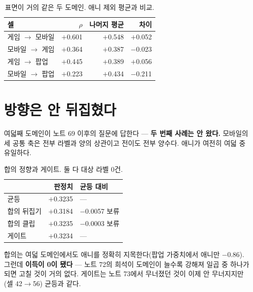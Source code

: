 \documentclass[10pt]{article}
\begin{document}
\begin{table}[t]
\centering\tsize
\caption{표면이 거의 같은 두 도메인. 애니 제외 평균과 비교.}
\begin{tabular}{lrrr}
\toprule
셀 & $\rho$ & 나머지 평균 & 차이 \\
\midrule
게임 $\to$ 모바일 & $+$0.601 & $+$0.548 & $+$0.052 \\
모바일 $\to$ 게임 & $+$0.364 & $+$0.387 & $-$0.023 \\
\midrule
게임 $\to$ 팝업 & $+$0.445 & $+$0.389 & $+$0.056 \\
모바일 $\to$ 팝업 & $+$0.223 & $+$0.434 & $-$0.211 \\
\bottomrule
\end{tabular}
\end{table}


\section{방향은 안 뒤집혔다}

여덟째 도메인이 노트 69 이후의 질문에 답한다 --- \textbf{두 번째 사례는 안
왔다.} 모바일의 세 공통 축은 전부 라벨과 양의 상관이고 전이도 전부 양수다.
애니가 여전히 여덟 중 유일하다.

\begin{table}[t]
\centering\tsize
\caption{합의 정향과 게이트. 둘 다 대상 라벨 0건.}
\begin{tabular}{lrl}
\toprule
& 판정치 & 균등 대비 \\
\midrule
균등 & $+$0.3235 & --- \\
합의 뒤집기 & $+$0.3184 & $-$0.0057 보류 \\
합의 클립 & $+$0.3235 & $-$0.0003 보류 \\
게이트 & $+$0.3234 & --- \\
\bottomrule
\end{tabular}
\end{table}

합의는 여덟 도메인에서도 애니를 정확히 지목한다(팝업 가중치에서 애니만
$-$0.86). 그런데 \textbf{이득이 0이 됐다} --- 노트 72의 희석이 도메인이 늘수록
강해져 일곱 중 하나가 되면 고칠 것이 거의 없다. 게이트는 노트 73에서 무너졌던
것이 이제 안 무너지지만(셀 42$\to$56) 균등과 같다.
\end{document}
